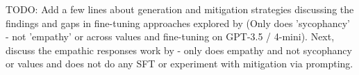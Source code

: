 \textcolor{black!30}{TODO: Add a few lines about generation and mitigation strategies discussing the findings and gaps in fine-tuning approaches explored by \cite{cheng-etal-sycophancy} (Only does 'sycophancy' - not 'empathy' or across values and fine-tuning on GPT-3.5 / 4-mini). Next, discuss the empathic responses work by \cite{Lee-etal-Empathic} - only does empathy and not sycophancy or values and does not do any SFT or experiment with mitigation via prompting.}

